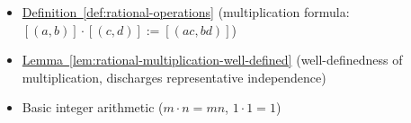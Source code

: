 \begin{dependencies}
\begin{itemize}
  \item \hyperref[def:rational-operations]{Definition~\ref*{def:rational-operations}}
        \textnormal{(multiplication formula: $[(a,b)]\cdot[(c,d)]:=[(ac,bd)]$)}
  \item \hyperref[lem:rational-multiplication-well-defined]{Lemma~\ref*{lem:rational-multiplication-well-defined}}
        \textnormal{(well-definedness of multiplication, discharges representative independence)}
  \item Basic integer arithmetic ($m\cdot n = mn$, $1\cdot 1 = 1$)
\end{itemize}
\end{dependencies}

\clearpage
